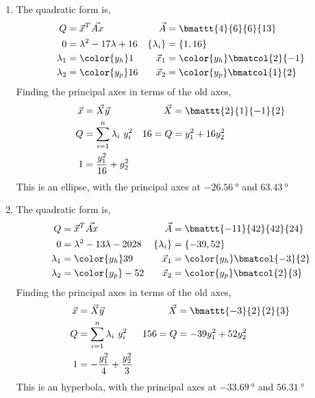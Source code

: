 \begin{enumerate}
    \item The quadratic form is,
          \begin{align}
              Q             & = \vec{x}^T \vec{Ax}          &
              \vec{A}       & = \bmattt{4}{6}{6}{13}          \\
              0             & = \lambda^2 - 17\lambda + 16  &
              \{\lambda_i\} & = \{1, 16\}                     \\
              \lambda_1     & = \color{y_h} 1               &
              \vec{x}_1     & = \color{y_h} \bmatcol{2}{-1}   \\
              \lambda_2     & = \color{y_p} 16              &
              \vec{x}_2     & = \color{y_p} \bmatcol{1}{2}
          \end{align}
          Finding the principal axes in terms of the old axes,
          \begin{align}
              \vec{x} & = \vec{X}\vec{y}                 &
              \vec{X} & = \bmattt{2}{1}{-1}{2}             \\
              Q       & = \sum_{i=1}^{n}\lambda_i\ y_i^2 &
              16 = Q  & = y_1^2 + 16y_2^2                  \\
              1       & = \frac{y_1^2}{16} + y_2^2
          \end{align}
          This is an ellipse, with the principal axes at
          $ \SI{-26.56}{\degree} $ and $ \SI{63.43}{\degree} $

    \item The quadratic form is,
          \begin{align}
              Q             & = \vec{x}^T \vec{Ax}           &
              \vec{A}       & = \bmattt{-11}{42}{42}{24}       \\
              0             & = \lambda^2 - 13\lambda - 2028 &
              \{\lambda_i\} & = \{-39, 52\}                    \\
              \lambda_1     & = \color{y_h} 39               &
              \vec{x}_1     & = \color{y_h} \bmatcol{-3}{2}    \\
              \lambda_2     & = \color{y_p} -52              &
              \vec{x}_2     & = \color{y_p} \bmatcol{2}{3}
          \end{align}
          Finding the principal axes in terms of the old axes,
          \begin{align}
              \vec{x} & = \vec{X}\vec{y}                     &
              \vec{X} & = \bmattt{-3}{2}{2}{3}                 \\
              Q       & = \sum_{i=1}^{n}\lambda_i\ y_i^2     &
              156 = Q & = -39y_1^2 + 52y_2^2                   \\
              1       & = -\frac{y_1^2}{4} + \frac{y_2^2}{3}
          \end{align}
          This is an hyperbola, with the principal axes at
          $ \SI{-33.69}{\degree} $ and $ \SI{56.31}{\degree} $


\end{enumerate}
